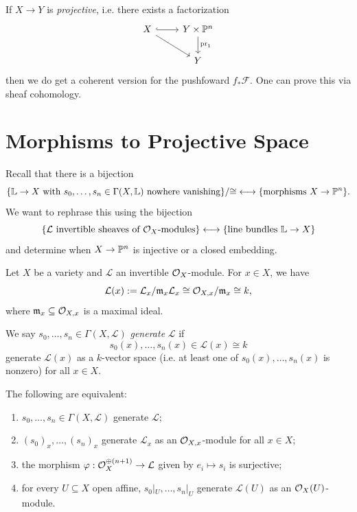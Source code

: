 \begin{remark}
  If $X \to Y$ is \emph{projective},
  i.e. there exists a factorization
  \[
    \begin{tikzcd}
      X \ar[r, hook] \ar[dr] & Y \times \PP^n
      \ar[d, "\mathrm{pr}_1"] \\
                      & Y
    \end{tikzcd}
  \]
  then we do get a coherent version for
  the pushfoward $f_* \mathcal{F}$.
  One can prove this via
  sheaf cohomology.
\end{remark}

\section{Morphisms to Projective Space}

\begin{remark}
  Recall that there is a bijection
  \[
    \{\mathbb{L} \to X \text{ with } s_0, \dots, s_n \in \Gamma(X, \mathbb{L}) \text{ nowhere vanishing}\} / {\cong}
    \longleftrightarrow
    \{\text{morphisms } X \to \mathbb{P}^n\}.
  \]
  We want to rephrase this using the
  bijection
  \[
    \{\mathcal{L} \text{ invertible sheaves of } \mathcal{O}_X\text{-modules}\}
    \longleftrightarrow
    \{
      \text{line bundles } \mathbb{L} \to X
    \}
  \]
  and determine when $X \to \mathbb{P}^n$ is
  injective or a closed embedding.
\end{remark}

\begin{remark}
  Let $X$ be a variety and $\mathcal{L}$
  an invertible $\mathcal{O}_X$-module.
  For $x \in X$, we have
  \[
    \mathcal{L}(x)
    := \mathcal{L}_x / \mathfrak{m}_x \mathcal{L}_x
    \cong \mathcal{O}_{X, x} / \mathfrak{m}_x
    \cong k,
  \]
  where $\mathfrak{m}_x \subseteq \mathcal{O}_{X, x}$ is a
  maximal ideal.
\end{remark}

\begin{definition}
  We say $s_0, \dots, s_n \in \Gamma(X, \mathcal{L})$
  \emph{generate} $\mathcal{L}$ if
  \[
    s_0(x), \dots, s_n(x)
    \in \mathcal{L}(x) \cong k
  \]
  generate $\mathcal{L}(x)$
  as a $k$-vector space
  (i.e. at least one of $s_0(x), \dots, s_n(x)$ is nonzero)
  for all $x \in X$.
\end{definition}

\begin{prop}\label{prop:generate}
  The following are equivalent:
  \begin{enumerate}
    \item $s_0, \dots, s_n \in \Gamma(X, \mathcal{L})$
      generate $\mathcal{L}$;
    \item $(s_0)_x, \dots, (s_n)_x$ generate $\mathcal{L}_x$ as an $\mathcal{O}_{X, x}$-module
      for all $x \in X$;
    \item the morphism
      $\varphi : \mathcal{O}_X^{\oplus (n + 1)} \to \mathcal{L}$
      given by $e_i \mapsto s_i$ is
      surjective;
    \item for every $U \subseteq X$ open
      affine,
      $s_0|_U, \dots, s_n|_U$ generate
      $\mathcal{L}(U)$ as an
      $\mathcal{O}_X(U)$-module.
  \end{enumerate}
\end{prop}

